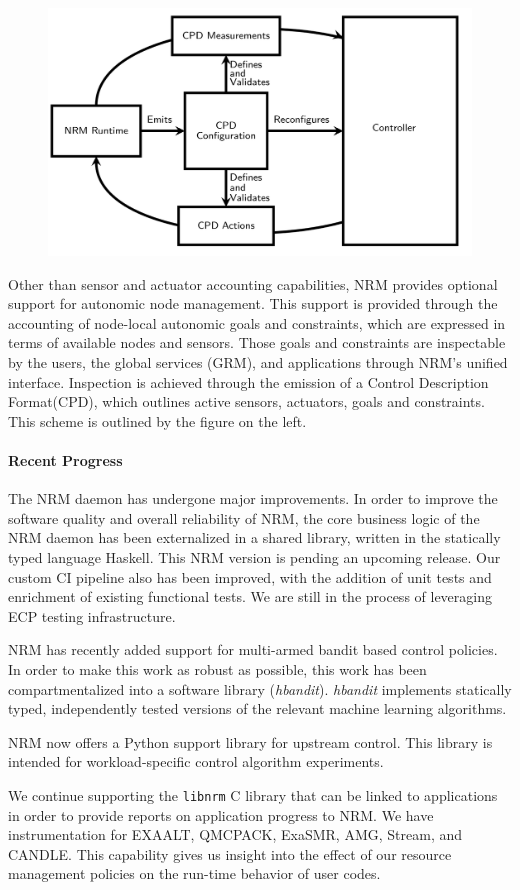 \begin{figure}
\includegraphics[width=.38\textwidth]{projects/2.3.1-PMR/2.3.1.19-Argo-PowerSteering/cpd}
\end{figure}
Other than sensor and actuator accounting capabilities, NRM provides
optional support for autonomic node management. This support is provided through
the accounting of node-local autonomic goals and constraints, which are
expressed in terms of available nodes and sensors. Those goals and
constraints are inspectable by the users, the global services (GRM), and
applications through NRM's unified interface. Inspection is achieved through
the emission of a Control Description Format(CPD), which outlines active
sensors, actuators, goals and constraints. This scheme is outlined by the
figure on the left.

\paragraph{Recent Progress}

The NRM daemon has undergone major improvements. In order to improve the
software quality and overall reliability of NRM, the core business logic
of the NRM daemon has been externalized in a shared library, written in the
statically typed language Haskell. This NRM version is pending an upcoming
release. Our custom CI pipeline also has been improved, with the addition
of unit tests and enrichment of existing functional tests. We are still in
the process of leveraging ECP testing infrastructure.

NRM has recently added support for multi-armed bandit based control policies.
In order to make this work as robust as possible, this work has been
compartmentalized into a software library (\textit{hbandit}). \textit{hbandit}
implements statically typed, independently tested versions of the relevant
machine learning algorithms.

NRM now offers a Python support library for upstream control. This library is
intended for workload-specific control algorithm experiments.

We continue supporting the \texttt{libnrm} C library that can be linked to
applications in order to provide reports on application progress to NRM. We have
instrumentation for EXAALT, QMCPACK, ExaSMR, AMG, Stream, and CANDLE.
This capability gives us insight into the effect of our resource management
policies on the run-time behavior of user codes.


